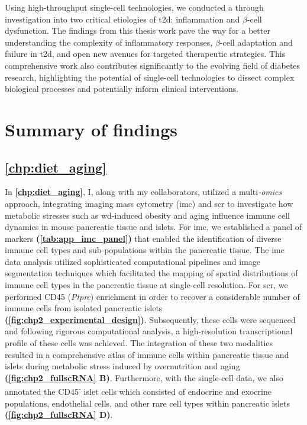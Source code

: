 Using high-throughput single-cell technologies, we conducted a through investigation into two critical etiologies of \gls{t2d}: inflammation and $\beta$-cell dysfunction. The findings from this thesis work pave the way for a better understanding the complexity of inflammatory responses, $\beta$-cell adaptation and failure in \gls{t2d}, and open new avenues for targeted therapeutic strategies. This comprehensive work also contributes significantly to the evolving field of diabetes research, highlighting the potential of single-cell technologies to dissect complex biological processes and potentially inform clinical interventions.

\section{Summary of findings}


\subsection{\autoref{chp:diet_aging}}

\par In \textbf{\autoref{chp:diet_aging}}, I, along with my collaborators, utilized a multi\textit{-omics} approach, integrating imaging mass cytometry (\gls{imc}) and \acrfull{scr} to investigate how metabolic stresses such as \acrfull{wd}-induced obesity and aging influence immune cell dynamics in mouse pancreatic tissue and islets. For \gls{imc}, we established a panel of markers \textbf{(\autoref{tab:app_imc_panel})} that enabled the identification of diverse immune cell types and sub-populations within the pancreatic tissue. The \gls{imc} data analysis utilized sophisticated computational pipelines and image segmentation techniques which facilitated the mapping of spatial distributions of immune cell types in the pancreatic tissue at single-cell resolution. For \gls{scr}, we performed CD45 (\textit{Ptprc}) enrichment in order to recover a considerable number of immune cells from isolated pancreatic islets \textbf{(\autoref{fig:chp2_experimental_design})}. Subsequently, these cells were sequenced and following rigorous computational analysis, a high-resolution transcriptional profile of these cells was achieved. The integration of these two modalities resulted in a comprehensive atlas of immune cells within pancreatic tissue and islets during metabolic stress induced by overnutrition and aging \textbf{(\autoref{fig:chp2_fullscRNA} B)}. Furthermore, with the single-cell data, we also annotated the CD45\textsuperscript{-} islet cells which consisted of endocrine and exocrine populations, endothelial cells, and other rare cell types within pancreatic islets \textbf{(\autoref{fig:chp2_fullscRNA} D)}. 

